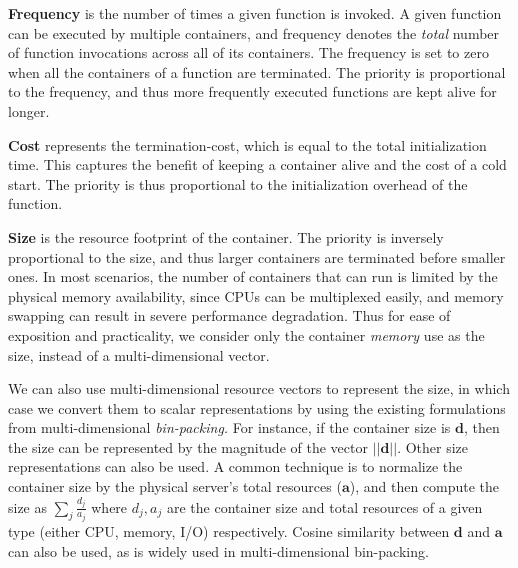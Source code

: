 \noindent \textbf{Frequency} is the number of times a given function is invoked.
A given function can be executed by multiple containers, and frequency denotes the \emph{total} number of function invocations across all of its containers. 
The frequency is set to zero when all the containers of a function are terminated.
The priority is proportional to the frequency, and thus more frequently executed functions are kept alive for longer. 
%
%


\noindent \textbf{Cost} represents the termination-cost, which is equal to the total initialization time. 
This captures the benefit of keeping a container alive and the cost of a cold start. 
The priority is thus proportional to the initialization overhead of the function. 



\noindent \textbf{Size} is the resource footprint of the container. 
The priority is inversely proportional to the size, and thus larger containers are terminated before smaller ones. 
In most scenarios, the number of containers that can run is limited by the physical memory availability, since CPUs can be multiplexed easily, and memory swapping can result in severe performance degradation.
Thus for ease of exposition and practicality, we consider only the container \emph{memory} use as the size, instead of a multi-dimensional vector. 


We can also use multi-dimensional resource vectors to represent the size, in which case we convert them to scalar representations by using the existing formulations from multi-dimensional \emph{bin-packing.}
For instance, if the container size is $\mathbf{d}$, then the size can be represented by the magnitude of the vector $||\mathbf{d}||$.
Other size representations can also be used.
A common technique is to normalize the container size by the physical server's total resources ($\mathbf{a}$), and then compute the size as $\sum_j \frac{d_j}{a_j}$ where $d_j, a_j$ are the container size and total resources of a given type (either CPU, memory, I/O) respectively.
Cosine similarity between $\mathbf{d}$ and $\mathbf{a}$ can also be used, as is widely used in multi-dimensional bin-packing.  



